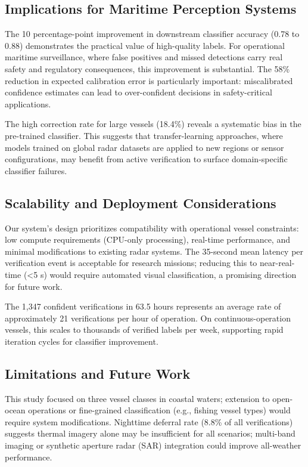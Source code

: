 \documentclass[conf]{asmeconf}
\begin{document}
\subsection{Implications for Maritime Perception Systems}

The 10 percentage-point improvement in downstream classifier accuracy (0.78 to 0.88) demonstrates the practical value of high-quality labels. For operational maritime surveillance, where false positives and missed detections carry real safety and regulatory consequences, this improvement is substantial. The 58\% reduction in expected calibration error is particularly important: miscalibrated confidence estimates can lead to over-confident decisions in safety-critical applications.

The high correction rate for large vessels (18.4\%) reveals a systematic bias in the pre-trained classifier. This suggests that transfer-learning approaches, where models trained on global radar datasets are applied to new regions or sensor configurations, may benefit from active verification to surface domain-specific classifier failures.

\subsection{Scalability and Deployment Considerations}

Our system's design prioritizes compatibility with operational vessel constraints: low compute requirements (CPU-only processing), real-time performance, and minimal modifications to existing radar systems. The 35-second mean latency per verification event is acceptable for research missions; reducing this to near-real-time (\textless 5 s) would require automated visual classification, a promising direction for future work.

The 1,347 confident verifications in 63.5 hours represents an average rate of approximately 21 verifications per hour of operation. On continuous-operation vessels, this scales to thousands of verified labels per week, supporting rapid iteration cycles for classifier improvement.

\subsection{Limitations and Future Work}

This study focused on three vessel classes in coastal waters; extension to open-ocean operations or fine-grained classification (e.g., fishing vessel types) would require system modifications. Nighttime deferral rate (8.8\% of all verifications) suggests thermal imagery alone may be insufficient for all scenarios; multi-band imaging or synthetic aperture radar (SAR) integration could improve all-weather performance.
\end{document}
